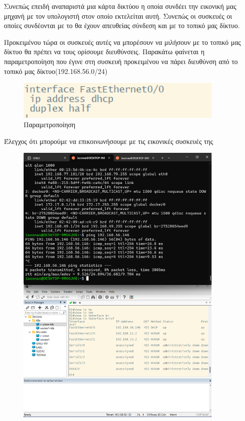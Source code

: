 Συνεπώς επειδή αναπαριστά μια κάρτα δικτύου η οποία συνδέει την εικονική μας μηχανή
με τον υπολογιστή στον οποίο εκτελείται αυτή. Συνεπώς οι συσκευές οι οποίες συνδέονται με το 
 θα έχουν απευθείας σύνδεση και με το τοπικό μας δίκτυο. 

Προκειμένου τώρα οι συσκευές αυτές να μπορέσουν να μιλήσουν με το τοπικό μας δίκτυο
θα πρέπει να τους ορίσουμε  διευθύνσεις. Παρακάτω φαίνεται η παραμετροποίηση που έγινε 
στη συσκευή προκειμένου να πάρει  διευθύνση από το τοπικό μας δίκτυο(192.168.56.0/24)

\FloatBarrier

\begin{figure}[htb]
	\centering
	\includegraphics[width=0.9\textwidth]{graphics/dhcp_cisco_config.png}
	\caption{Παραμετροποίηση }
\end{figure}

\FloatBarrier

Έλεγχος ότι μπορούμε να επικοινωνήσουμε με τις εικονικές συσκευές της 

\FloatBarrier

\begin{figure}[htb]
	\centering
	\includegraphics[width=0.9\textwidth]{graphics/test_ip_connectivity.png}
	\caption{}
\end{figure}

